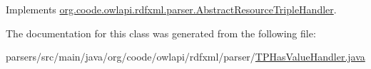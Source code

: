 Implements \hyperlink{classorg_1_1coode_1_1owlapi_1_1rdfxml_1_1parser_1_1_abstract_resource_triple_handler_acfa19ca318d5aaf7fc66e361ba02e7e8}{org.\-coode.\-owlapi.\-rdfxml.\-parser.\-Abstract\-Resource\-Triple\-Handler}.



The documentation for this class was generated from the following file\-:\begin{DoxyCompactItemize}
\item 
parsers/src/main/java/org/coode/owlapi/rdfxml/parser/\hyperlink{_t_p_has_value_handler_8java}{T\-P\-Has\-Value\-Handler.\-java}\end{DoxyCompactItemize}
